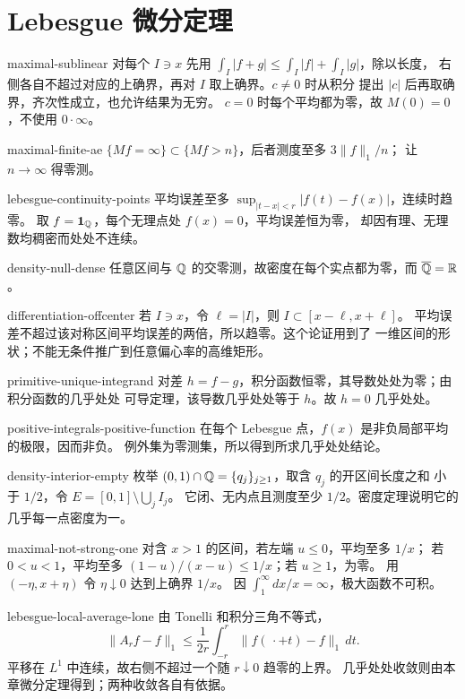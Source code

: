 \chapter{Lebesgue 微分定理}
\begin{solution}{maximal-sublinear}
对每个 \(I\ni x\) 先用 \(\int_I|f+g|\le\int_I|f|+\int_I|g|\)，除以长度，
右侧各自不超过对应的上确界，再对 \(I\) 取上确界。\(c\ne0\) 时从积分
提出 \(|c|\) 后再取确界，齐次性成立，也允许结果为无穷。
\(c=0\) 时每个平均都为零，故 \(M(0)=0\)，不使用 \(0\cdot\infty\)。
\end{solution}
\begin{solution}{maximal-finite-ae}
\(\{Mf=\infty\}\subset\{Mf>n\}\)，后者测度至多 \(3\|f\|_1/n\)；
让 \(n\to\infty\) 得零测。
\end{solution}
\begin{solution}{lebesgue-continuity-points}
平均误差至多 \(\sup_{|t-x|<r}|f(t)-f(x)|\)，连续时趋零。
取 \(f=\mathbf1_{\mathbb{Q}}\)，每个无理点处 \(f(x)=0\)，平均误差恒为零，
却因有理、无理数均稠密而处处不连续。
\end{solution}
\begin{solution}{density-null-dense}
任意区间与 \(\mathbb{Q}\) 的交零测，故密度在每个实点都为零，而 \(\overline{\mathbb{Q}}=\mathbb{R}\)。
\end{solution}
\begin{solution}{differentiation-offcenter}
若 \(I\ni x\)，令 \(\ell=|I|\)，则 \(I\subset[x-\ell,x+\ell]\)。
平均误差不超过该对称区间平均误差的两倍，所以趋零。这个论证用到了
一维区间的形状；不能无条件推广到任意偏心率的高维矩形。
\end{solution}
\begin{solution}{primitive-unique-integrand}
对差 \(h=f-g\)，积分函数恒零，其导数处处为零；由积分函数的几乎处处
可导定理，该导数几乎处处等于 \(h\)。故 \(h=0\) 几乎处处。
\end{solution}
\begin{solution}{positive-integrals-positive-function}
在每个 Lebesgue 点，\(f(x)\) 是非负局部平均的极限，因而非负。
例外集为零测集，所以得到所求几乎处处结论。
\end{solution}
\begin{solution}{density-interior-empty}
枚举 \((0,1)\cap\mathbb{Q}=\{q_j\}_{j\ge1}\)，取含 \(q_j\) 的开区间长度之和
小于 \(1/2\)，令 \(E=[0,1]\setminus\bigcup_jI_j\)。
它闭、无内点且测度至少 \(1/2\)。密度定理说明它的几乎每一点密度为一。
\end{solution}
\begin{solution}{maximal-not-strong-one}
对含 \(x>1\) 的区间，若左端 \(u\le0\)，平均至多 \(1/x\)；
若 \(0<u<1\)，平均至多 \((1-u)/(x-u)\le1/x\)；若 \(u\ge1\)，为零。
用 \((-\eta,x+\eta)\) 令 \(\eta\downarrow0\) 达到上确界 \(1/x\)。
因 \(\int_1^\infty dx/x=\infty\)，极大函数不可积。
\end{solution}
\begin{solution}{lebesgue-local-average-lone}
由 Tonelli 和积分三角不等式，
\[
 \|A_rf-f\|_1
 \le\frac1{2r}\int_{-r}^r\|f(\,\cdot+t)-f\|_1\,dt.
\]
平移在 \(L^1\) 中连续，故右侧不超过一个随 \(r\downarrow0\) 趋零的上界。
几乎处处收敛则由本章微分定理得到；两种收敛各自有依据。
\end{solution}
